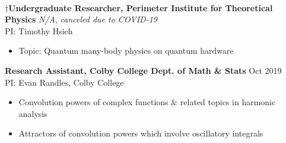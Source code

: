 \documentclass[letter, 10pt]{article}
\newcommand{\longunderline}[1]{\uline{#1\hfill\mbox{}}}
\begin{document}
	\vspace{-7pt}
	\noindent \longunderline{\normalsize{{}}}
	\\ \vspace{-7pt}
	
	\noindent $\dagger$\textbf{Undergraduate Researcher, Perimeter Institute for Theoretical Physics} \hfill \textit{N/A},
	\textit{canceled due to COVID-19}\\
	\noindent PI: Timothy Hsieh
	\begin{itemize}[noitemsep, nolistsep]
		\item Topic: Quantum many-body physics on quantum hardware
	\end{itemize}
	
	\noindent \textbf{Research Assistant, Colby College Dept. of Math \& Stats} \hfill Oct 2019\textemdash \\ 
	\noindent PI: {Evan Randles}, Colby College
	\begin{itemize}[noitemsep, nolistsep]
		\item Convolution powers of complex functions \& related topics in harmonic analysis
		\item Attractors of convolution powers which involve oscillatory integrals 
	\end{itemize}
	
\end{document}
